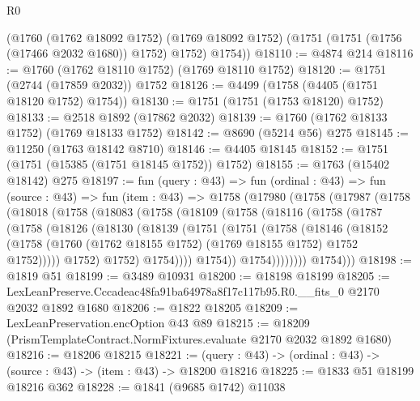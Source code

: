 \begin{lexlean}{R0}
\begin{coremodule}
      (@1760
        (@1762 @18092 @1752)
        (@1769 @18092 @1752)
        (@1751 (@1751 (@1756 (@17466 @2032 @1680)) @1752) @1752)
        @1754))
@18110 := @4874 @214
@18116 := @1760 (@1762 @18110 @1752) (@1769 @18110 @1752)
@18120 := @1751 (@2744 (@17859 @2032)) @1752
@18126 := @4499 (@1758 (@4405 (@1751 @18120 @1752) @1754))
@18130 := @1751 (@1751 (@1753 @18120) @1752)
@18133 := @2518 @1892 (@17862 @2032)
@18139 := @1760 (@1762 @18133 @1752) (@1769 @18133 @1752)
@18142 := @8690 (@5214 @56) @275
@18145 := @11250 (@1763 @18142 @8710)
@18146 := @4405 @18145
@18152 := @1751 (@1751 (@15385 (@1751 @18145 @1752)) @1752)
@18155 := @1763 (@15402 @18142) @275
@18197 := fun (query : @43) =>
  fun (ordinal : @43) =>
  fun (source : @43) =>
  fun (item : @43) =>
  @1758
    (@17980
      (@1758
        (@17987
          (@1758
            (@18018
              (@1758
                (@18083
                  (@1758
                    (@18109
                      (@1758
                        (@18116
                          (@1758
                            (@1787
                              (@1758
                                (@18126
                                  (@18130
                                    (@18139
                                      (@1751
                                        (@1751
                                          (@1758
                                            (@18146
                                              (@18152
                                                (@1758
                                                  (@1760
                                                    (@1762 @18155 @1752)
                                                    (@1769 @18155 @1752)
                                                    @1752
                                                    @1752)))))
                                          @1752)
                                        @1752)
                                      @1754))))
                              @1754))
                          @1754))))))))
          @1754)))
@18198 := @1819 @51
@18199 := @3489 @10931
@18200 := @18198 @18199
@18205 := LexLeanPreserve.Cccadeac48fa91ba64978a8f17c117b95.R0.__fits_0 @2170 @2032 @1892 @1680
@18206 := @1822 @18205
@18209 := LexLeanPreservation.encOption @43 @89
@18215 := @18209 (PrismTemplateContract.NormFixtures.evaluate @2170 @2032 @1892 @1680)
@18216 := @18206 @18215
@18221 := (query : @43) -> (ordinal : @43) -> (source : @43) -> (item : @43) -> @18200 @18216
@18225 := @1833 @51 @18199 @18216 @362
@18228 := @1841 (@9685 @1742) @11038

\end{coremodule}
\end{lexlean}
